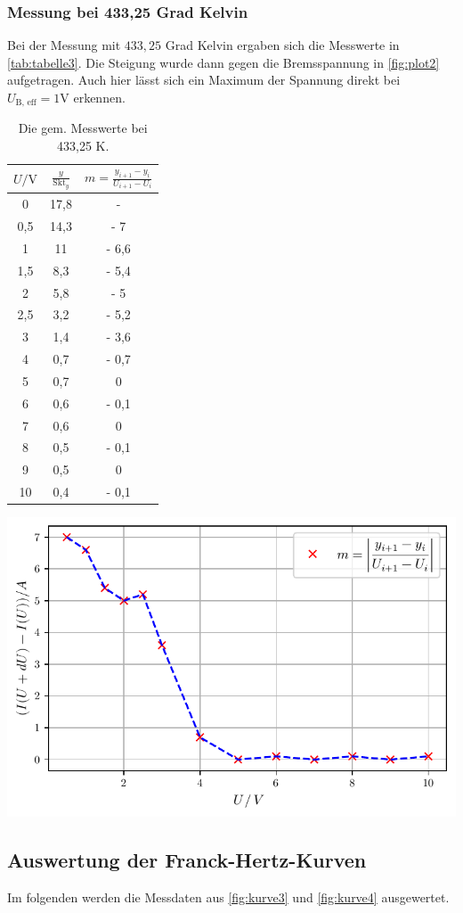 \subsubsection*{Messung bei 433,25 Grad Kelvin}

Bei der Messung mit $433,25$ Grad Kelvin ergaben sich die Messwerte in \autoref{tab:tabelle3}.
Die Steigung wurde dann gegen die Bremsspannung in \autoref{fig:plot2} aufgetragen.
Auch hier lässt sich ein Maximum der Spannung direkt bei $U_{\text{B, eff}} = 1 \unit\V$ erkennen.

\begin{table}[ht]
  \begin{minipage}[b]{0.4\linewidth}
  \centering
  \begin{tabular}{c c c}
    \toprule
    $U / \unit\V$ & $\frac{y}{\text{Skt}_y}$ & $m  =\frac{y_{i+1} - y_{i}}{U_{i+1} - U_{i}}$ \\
    \midrule 
    0   & 17,8& - \\
    0,5 & 14,3& - 7 \\
    1   & 11  & -  6,6 \\ 
    1,5 & 8,3 & - 5,4 \\ 
    2   & 5,8 & - 5 \\  
    2,5 & 3,2 & - 5,2 \\ 
    3   & 1,4 & - 3,6 \\ 
    4   & 0,7 & - 0,7 \\
    5   & 0,7 & 0 \\  
    6   & 0,6 & - 0,1 \\ 
    7   & 0,6 & 0 \\ 
    8   & 0,5 & -  0,1 \\ 
    9   & 0,5 & 0 \\ 
    10  & 0,4 & -  0,1 \\
    \bottomrule
  \end{tabular}
    \caption{Die gem. Messwerte bei 433,25 K.}
    \label{tab:tabelle3}
  \end{minipage}\hfill
  \begin{minipage}[b]{0.45\linewidth}
  \centering
  \includegraphics[width=\linewidth]{build/plot2.pdf}
  \label{fig:plot2}
  \end{minipage}
\end{table}


\subsection{Auswertung der Franck-Hertz-Kurven}

Im folgenden werden die Messdaten aus \autoref{fig:kurve3} und \autoref{fig:kurve4} ausgewertet.
